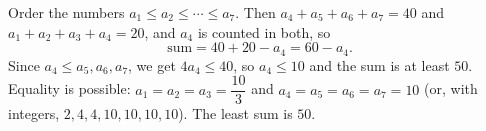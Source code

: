 Order the numbers $a_1\le a_2\le\cdots\le a_7$. Then $a_4+a_5+a_6+a_7=40$ and $a_1+a_2+a_3+a_4=20$, and $a_4$ is counted in both, so
\[
\text{sum}=40+20-a_4=60-a_4 .
\]
Since $a_4\le a_5,a_6,a_7$, we get $4a_4\le40$, so $a_4\le10$ and the sum is at least $50$. Equality is possible: $a_1=a_2=a_3=\dfrac{10}{3}$ and $a_4=a_5=a_6=a_7=10$ (or, with integers, $2,4,4,10,10,10,10$). The least sum is $\boxed{50}$.
